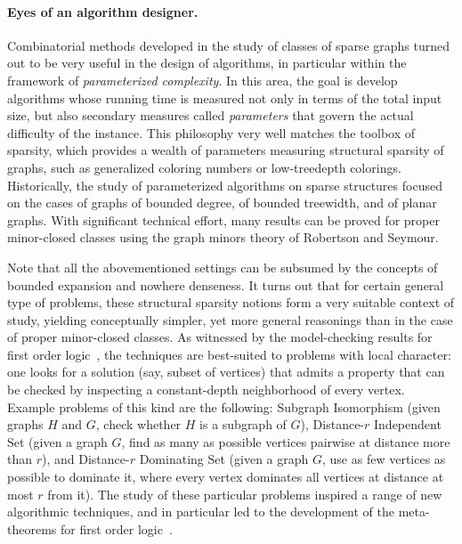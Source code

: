\paragraph*{Eyes of an algorithm designer.} 
Combinatorial methods developed in the study of classes of sparse graphs turned out to be very useful in the design of algorithms, in particular within the framework of {\em{parameterized complexity}}.
In this area, the goal is develop algorithms whose running time is measured not only in terms of the total input size, but also secondary measures called {\em{parameters}} that govern the actual 
difficulty of the instance. This philosophy very well matches the toolbox of sparsity, which provides a wealth of parameters measuring structural sparsity of graphs, such as generalized coloring numbers or
low-treedepth colorings. Historically, the study of parameterized algorithms on sparse structures focused on the cases of graphs of bounded degree, of bounded treewidth, and of planar graphs. 
With significant technical effort, many results can be proved for proper minor-closed classes using the graph minors theory of Robertson and Seymour. 

Note that all the abovementioned settings can be subsumed by the concepts of bounded expansion and nowhere denseness.
It turns out that for certain general type of problems, these structural sparsity notions form a very suitable context of study, yielding conceptually simpler, yet more general reasonings than 
in the case of proper minor-closed classes. As witnessed by the model-checking results for first order logic~\cite{DvorakKT13,grohe2017deciding}, the techniques are best-suited to problems with local character:
one looks for a solution (say, subset of vertices) that admits a property that can be checked by inspecting a constant-depth neighborhood of every vertex.
Example problems of this kind are the following: Subgraph Isomorphism (given graphs $H$ and $G$, check whether $H$ is a subgraph of $G$), Distance-$r$ Independent Set (given a graph $G$, find as many as possible
vertices pairwise at distance more than $r$), and Distance-$r$ Dominating Set (given a graph $G$, use as few vertices as possible to dominate it, 
where every vertex dominates all vertices at distance at most $r$ from it).
The study of these particular problems inspired a range of new algorithmic techniques, and in particular led to the development of the meta-theorems for first order logic~\cite{DvorakKT13,grohe2017deciding}.

